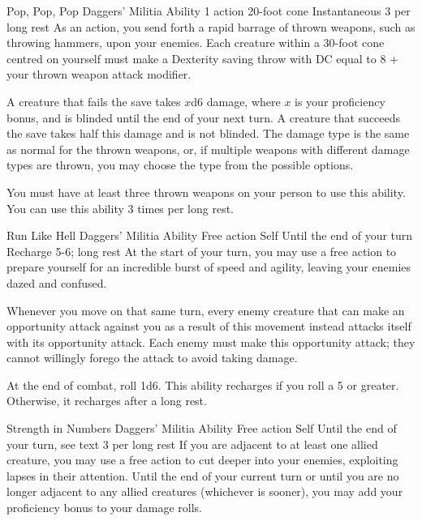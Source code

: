 \ability%
    {Pop, Pop, Pop}
    {Daggers' Militia Ability}
    {1 action}
    {20-foot cone}
    {Instantaneous}
    {3 per long rest}
As an action,
you send forth a rapid barrage of thrown weapons,
such as throwing hammers, upon your enemies.
Each creature within a 30-foot cone centred on yourself
must make a Dexterity saving throw with DC equal to
8 + your thrown weapon attack modifier.

A creature that fails the save takes $x$d6 damage,
where $x$ is your proficiency bonus,
and is blinded until the end of your next turn.
A creature that succeeds the save takes half this damage
and is not blinded.
The damage type is the same as normal for the thrown weapons,
or, if multiple weapons with different damage types are thrown,
you may choose the type from the possible options.

You must have at least three thrown weapons on your person
to use this ability.
You can use this ability 3 times per long rest.


\ability%
    {Run Like Hell}
    {Daggers' Militia Ability}
    {Free action}
    {Self}
    {Until the end of your turn}
    {Recharge 5-6; long rest}
At the start of your turn,
you may use a free action to prepare yourself
for an incredible burst of speed and agility,
leaving your enemies dazed and confused.

Whenever you move on that same turn,
every enemy creature that can make an opportunity attack
against you as a result of this movement
instead attacks itself with its opportunity attack.
Each enemy must make this opportunity attack;
they cannot willingly forego the attack to
avoid taking damage.

At the end of combat, roll 1d6.
This ability recharges if you roll a 5 or greater.
Otherwise, it recharges after a long rest.


\ability%
    {Strength in Numbers}
    {Daggers' Militia Ability}
    {Free action}
    {Self}
    {Until the end of your turn, see text}
    {3 per long rest}
If you are adjacent to at least one allied creature,
you may use a free action to cut deeper into your enemies,
exploiting lapses in their attention.
Until the end of your current turn
or until you are no longer adjacent to any allied creatures
(whichever is sooner),
you may add your proficiency bonus to your damage rolls.


